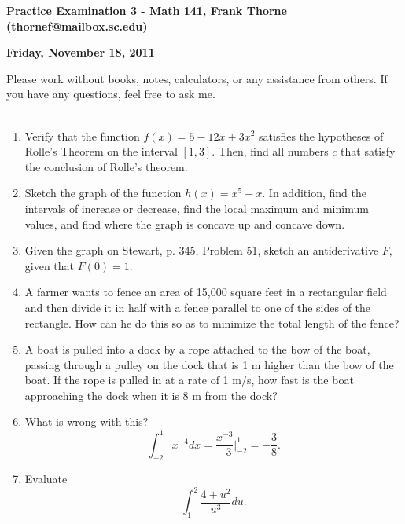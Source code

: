 \documentclass[11pt]{article}
\begin{document}
\setlength{\topmargin}{-2mm}





\begin{center}{\bf Practice Examination 3 - Math 141, Frank Thorne (thornef@mailbox.sc.edu)}
\end{center}
\begin{center}
{\bf Friday, November 18, 2011}
\end{center}

Please work without books, notes, calculators, or any assistance from others. If you have
any questions, feel free to ask me. 
\\
\\
\begin{enumerate}[(1)]
\item
Verify that the function $f(x) = 5 - 12x + 3x^2$ satisfies the hypotheses of Rolle's
Theorem on the interval $[1, 3]$. Then, find all numbers $c$ that satisfy the conclusion
of Rolle's theorem.

\item
Sketch the graph of the function $h(x) = x^5 - x$. In addition, find the intervals
of increase or decrease, find the local maximum and minimum values, and find where the graph
is concave up and concave down.

\item
Given the graph on Stewart, p. 345, Problem 51, sketch an antiderivative $F$, given that
$F(0) = 1$.

\item
A farmer wants to fence an area of 15,000 square feet in a rectangular field and then
divide it in half with a fence parallel to one of the sides of the rectangle. How can he
do this so as to minimize the total length of the fence?

\item
A boat is pulled into a dock by a rope attached to the bow of the boat, passing
through a pulley on the dock that is 1 m higher than the bow of the boat. If the rope is pulled
in at a rate of 1 m/s, how fast is the boat approaching the dock when it is 8 m from the dock?

\item
What is wrong with this?
$$ \int_{-2}^1 x^{-4} dx = \frac{x^{-3}}{-3} \bigg|_{-2}^1 = - \frac{3}{8}.$$

\item
Evaluate
$$\int_1^2 \frac{4 + u^2}{u^3} du.$$

\end{enumerate}
\end{document}
